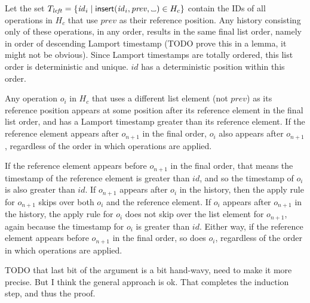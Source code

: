 \documentclass[a4paper,twocolumn,10pt]{article}
\newcommand{\placeholder}{%
  \makebox[0.7em]{%
    \kern.07em
    \vrule height.3ex
    \hrulefill
    \vrule height.3ex
    \kern.07em
  }%
}
\begin{document}
Let the set $T_\mathit{left} = \{\mathit{id}_i \mid \mathsf{insert}(\mathit{id}_i, \mathit{prev}, \placeholder) \in H_c\}$ contain the IDs of all operations in $H_c$ that use $\mathit{prev}$ as their reference position. Any history consisting only of these operations, in any order, results in the same final list order, namely in order of descending Lamport timestamp (TODO prove this in a lemma, it might not be obvious). Since Lamport timestamps are totally ordered, this list order is deterministic and unique. $\mathit{id}$ has a deterministic position within this order.

Any operation $o_i$ in $H_c$ that uses a different list element (not $\mathit{prev}$) as its reference position appears at some position after its reference element in the final list order, and has a Lamport timestamp greater than its reference element. If the reference element appears after $o_{n+1}$ in the final order, $o_i$ also appears after $o_{n+1}$, regardless of the order in which operations are applied.

If the reference element appears before $o_{n+1}$ in the final order, that means the timestamp of the reference element is greater than $\mathit{id}$, and so the timestamp of $o_i$ is also greater than $\mathit{id}$. If $o_{n+1}$ appears after $o_i$ in the history, then the apply rule for $o_{n+1}$ skips over both $o_i$ and the reference element. If $o_i$ appears after $o_{n+1}$ in the history, the apply rule for $o_i$ does not skip over the list element for $o_{n+1}$, again because the timestamp for $o_i$ is greater than $\mathit{id}$. Either way, if the reference element appears before $o_{n+1}$ in the final order, so does $o_i$, regardless of the order in which operations are applied.

TODO that last bit of the argument is a bit hand-wavy, need to make it more precise. But I think the general approach is ok. That completes the induction step, and thus the proof.

\fi %

{\footnotesize

{}}
\end{document}
